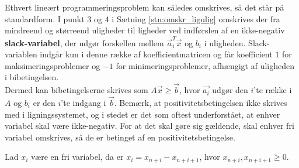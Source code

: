 Ethvert lineært programmeringsproblem kan således omskrives, så det står på standardform. 
I punkt $3$ og $4$ i Sætning \ref{stn:omskr_ligulig} omskrives der fra mindreend og størreend uligheder til ligheder ved indførslen af en ikke-negativ \textbf{slack-variabel}, der udgør forskellen mellem $\vec{a}_i^T\vec{x}$ og $b_i$ i uligheden. Slack-variablen indgår kun i denne række af koefficientmatricen og får koefficient $1$ for maksimeringsproblemer og $-1$ for minimeringsproblemer, afhængigt af uligheden i bibetingelsen. \\

Dermed kan bibetingelserne skrives som $A\vec{x}\geq \vec{b}$, hvor $\vec{a_i}$ udgør den $i$'te række i $A$ og $b_i$ er den $i$'te indgang i $\vec{b}$.
Bemærk, at positivitetsbetingelsen ikke skrives med i ligningssystemet, og i stedet er det som oftest underforstået, at enhver variabel skal være ikke-negativ.
For at det skal gøre sig gældende, skal enhver fri variabel omskrives, så de er betinget af en positivitetsbetingelse.
\begin{stn}
Lad $x_i$ være en fri variabel, da er $x_i = x_{n+i}-x_{n+i+1}$, hvor $x_{n+i},x_{n+i+1}\geq 0$.
\end{stn}




\begin{comment}
Derved bliver betingelserne for henholdsvis et maksimeringsproblem og et minimeringsproblem omskrevet til:
\begin{align*}
	A' &=\rvect{A & I_m}\\
	A' &=\rvect{A & -I_m}
\end{align*}


Man må vel ikke bare sige at $x_1 \geq 0$, men man skal sige at $x_1 = x_3 - x_4$, hvor $x_3, x_4 \geq 0$.
\end{comment}